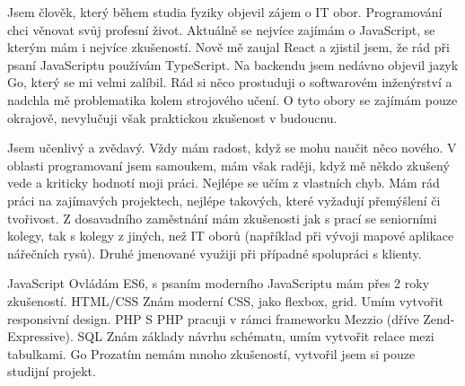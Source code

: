 \documentclass[9pt]{developercv} %
\begin{document}

\begin{minipage}[t]{0.45\textwidth} %
	\vspace{-\baselineskip} %

	Jsem člověk, který během studia fyziky objevil zájem o IT obor. Programování chci věnovat
	svůj profesní život. Aktuálně se nejvíce zajímám o JavaScript, se kterým
	mám i nejvíce zkušeností. Nově mě zaujal React a zjistil jsem, že rád při psaní JavaScriptu
	používám TypeScript.
	Na backendu jsem nedávno objevil jazyk Go, který se mi velmi zalíbil. Rád si něco prostuduji
	o softwarovém inženýrství a nadchla mě problematika kolem strojového učení. O tyto
	obory se zajímám pouze okrajově, nevylučuji však praktickou zkušenost v budoucnu.
\end{minipage}
\hfill %
\begin{minipage}[t]{0.45\textwidth} %
	\vspace{-\baselineskip} %

	Jsem učenlivý a zvědavý. Vždy mám radost, když se mohu naučit něco nového. V oblasti
	programovaní jsem samoukem, mám však raději, když mě někdo zkušený vede
	a kriticky hodnotí moji práci. Nejlépe se učím z vlastních chyb. Mám rád
	práci na zajímavých projektech, nejlépe takových, které vyžadují přemýšlení
	či tvořivost. Z dosavadního zaměstnání mám zkušenosti jak
	s prací se seniorními kolegy, tak s kolegy z jiných, než
	IT oborů (například při vývoji mapové aplikace nářečních rysů). Druhé
	jmenované využiji při případné spolupráci s klienty.
	
\end{minipage}



\begin{entrylist}
	\entryShorter
		{JavaScript}
		{Ovládám ES6, s psaním moderního JavaScriptu mám přes 2 roky
		zkušeností.}
	\entryShorter
		{HTML/CSS}
		{Znám moderní CSS, jako flexbox, grid. Umím vytvořit
		responsivní design.}
	\entryShorter
		{PHP}
		{S PHP pracuji v rámci frameworku Mezzio (dříve
		Zend-Expressive).}
	\entryShorter
		{SQL}
		{Znám základy návrhu schématu, umím vytvořit relace
		mezi tabulkami.}
	\entryShorter
		{Go}
		{Prozatím nemám mnoho zkušeností, vytvořil jsem si pouze
		studijní projekt.}
\end{entrylist}
\end{document}
